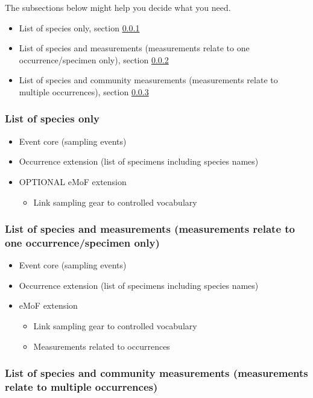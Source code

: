 \documentclass[a4paper,english, 11pt]{article}
\begin{document}
The subsections below might help you decide what you need.
\begin{itemize}
\item List of species only, section \ref{ss:listspeciesonly}
\item List of species and measurements (measurements relate to one occurrence/specimen only), section \ref{ss:speciesmeasurementsoneoccurrence}
\item List of species and community measurements (measurements relate to multiple occurrences), section \ref{ss:speciesmeasurementsmultipleoccurrence}
\end{itemize}

\subsubsection{List of species only}
\label{ss:listspeciesonly}

\begin{itemize}
\item Event core (sampling events)
\item Occurrence extension (list of specimens including species names)
\item OPTIONAL eMoF extension
\begin{itemize}
\item Link sampling gear to controlled vocabulary
\end{itemize}
\end{itemize}

\subsubsection{List of species and measurements (measurements relate to one occurrence/specimen only)}
\label{ss:speciesmeasurementsoneoccurrence}

\begin{itemize}
\item Event core (sampling events)
\item Occurrence extension (list of specimens including species names)
\item eMoF extension
\begin{itemize}
\item Link sampling gear to controlled vocabulary
\item Measurements related to occurrences
\end{itemize}
\end{itemize}

\subsubsection{List of species and community measurements (measurements relate to multiple occurrences)}
\label{ss:speciesmeasurementsmultipleoccurrence}
\end{document}
